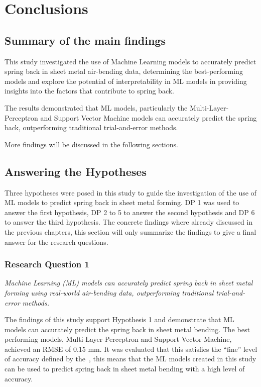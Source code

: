 \chapter{Conclusions}\label{ch:conclusions}


\section{Summary of the main findings}\label{sec:summary-of-the-main-findings}
This study investigated the use of Machine Learning models to accurately predict spring back in sheet metal
air-bending data, determining the best-performing models and explore the potential of interpretability in ML models in
providing insights into the factors that contribute to spring back.

The results demonstrated that ML models, particularly the Multi-Layer-Perceptron and Support Vector Machine models can
accurately predict the spring back, outperforming traditional trial-and-error methods.

More findings will be discussed in the following sections.

\section{Answering the Hypotheses}\label{sec:answering-the-research-question}
Three hypotheses were posed in this study to guide the investigation of the use of \ac{ML} models to predict
spring back in sheet metal forming.
\ac{DP} 1 was used to answer the first hypothesis, \ac{DP} 2 to 5 to answer the second hypothesis and \ac{DP} 6 to
answer the third hypothesis.
The concrete findings where already discussed in the previous chapters, this section will only summarize the findings
to give a final answer for the research questions.

\subsection{Research Question 1}
\label{subsec:research-question-1:-can-machine-learning-models-accurately-predict-spring-back-in-sheet-metal-forming?}
\textit{Machine Learning (ML) models can accurately predict spring back in sheet metal forming using
real-world air-bending data, outperforming traditional trial-and-error methods.}

The findings of this study support Hypothesis 1 and demonstrate that \ac{ML} models can accurately predict the spring
back in sheet metal bending.
The best performing models, Multi-Layer-Perceptron and Support Vector Machine, achieved an RMSE of 0.15 mm.
It was evaluated that this satisfies the ``fine'' level of accuracy defined by the~\cite{ISO2768}, this means that
the \ac{ML} models created in this study can be used to predict spring back in sheet metal bending with a high level
of accuracy.


